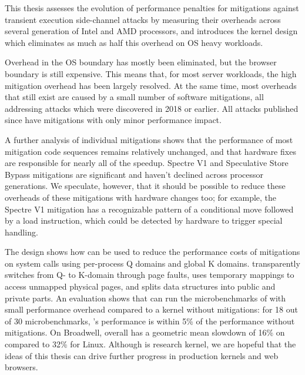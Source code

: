 \label{s:concl}

This thesis assesses the evolution of performance penalties for
mitigations against transient execution side-channel attacks by
measuring their overheads across several generation of Intel and AMD
processors, and introduces the \sys kernel design which eliminates as much
as half this overhead on OS heavy workloads.

Overhead in the OS boundary has mostly been eliminated, but the browser boundary is still expensive.
This means that, for most server workloads, the high mitigation overhead has been largely resolved.
At the same time, most overheads that still exist are caused by a small number of software mitigations, all addressing attacks which were discovered in 2018 or earlier.
All attacks published since have mitigations with only minor performance impact.

A further analysis of individual mitigations shows that the performance of most mitigation code sequences remains relatively unchanged, and that hardware fixes are responsible for nearly all of the speedup.
Spectre V1 and Speculative Store Bypass mitigations are significant and haven't declined across processor generations.
We speculate, however, that it should be possible to reduce these overheads of these mitigations with hardware changes too;
for example, the Spectre V1 mitigation has a recognizable pattern of a
conditional move followed by a load instruction, which could be
detected by hardware to trigger special handling.

The \sys design
shows how \contract can be used to reduce the performance costs of
mitigations on system calls using per-process Q domains and global K
domains.  \sys transparently switches from Q- to K-domain through page
faults, uses temporary mappings to access unmapped physical pages, and
splits data structures into public and private parts.  An evaluation
shows that \sys can run the microbenchmarks of \bench with small
performance overhead compared to a kernel without mitigations: for
18 out of 30 \bench microbenchmarks, \sys's performance is within 5\%
of the performance without mitigations.
On Broadwell, \sys overall has a geometric mean slowdown of 16\% on \bench compared to 32\% for Linux.
Although \sys is research kernel, we are hopeful that the ideas of this thesis can drive further progress in production kernels and web browsers.
